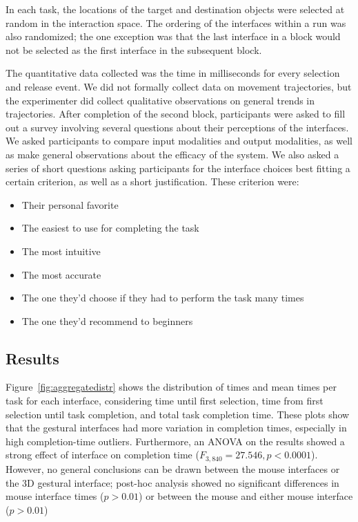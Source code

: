 \documentclass[pageno]{jpaper}
\begin{document}
In each task, the locations of the target and destination objects were selected at random in the interaction space. The
ordering of the interfaces within a run was also randomized; the one exception was that the last interface in a block
would not be selected as the first interface in the subsequent block. 

The quantitative data collected was the time in milliseconds for every selection and release event. We did not formally
collect data on movement trajectories, but the experimenter did collect qualitative observations on general trends in
trajectories. After completion of the second block, participants were asked to fill out a survey involving several questions
about their perceptions of the interfaces. We asked participants to compare input modalities and output modalities, as well as
make general observations about the efficacy of the system. We also asked a series of short questions asking participants for
the interface choices best fitting a certain criterion, as well as a short justification. These criterion were:
\begin{itemize}
\item Their personal favorite
\item The easiest to use for completing the task
\item The most intuitive
\item The most accurate
\item The one they'd choose if they had to perform the task many times
\item The one they'd recommend to beginners
\end{itemize}
\subsection{Results}
Figure~\ref{fig:aggregatedistr} shows the distribution of times and mean times per task for each interface, considering time until first selection, time from first selection until
task completion, and total task completion time. These plots show that the gestural interfaces had more variation in completion times, especially in high completion-time
outliers. Furthermore, an ANOVA on the results showed a strong effect of interface on completion time ($F_{3,840}=27.546, p < 0.0001$). 
However, no general conclusions can be drawn between the mouse interfaces or the 3D gestural interface; post-hoc analysis showed no significant differences
in mouse interface times ($p > 0.01$) or between the mouse and either mouse interface ($p > 0.01$)
\end{document}
